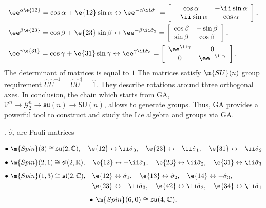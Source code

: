 \begin{example}
\begin{example}
\[\begin{split}
&\ee^{\alpha\e{12}}=\cos\alpha+\e{12}\sin\alpha\leftrightarrow\ee^{-\alpha\ii\hat{\sigma}_1}=
\left[\begin{array}{cc}\cos\alpha&-\ii\sin\alpha\\-\ii\sin\alpha&\cos\alpha\end{array}\right],\\
&\ee^{\beta\e{23}}=\cos\beta+\e{23}\sin\beta\leftrightarrow\ee^{-\beta\ii\hat{\sigma}_2}=
\left[\begin{array}{cc}\cos\beta&-\sin\beta\\\sin\beta&\cos\beta\end{array}\right],\\
&\ee^{\gamma\e{31}}=\cos\gamma+\e{31}\sin\gamma\leftrightarrow\ee^{\gamma\ii\hat{\sigma}_3}=
\left[\begin{array}{cc}\ee^{\ii\gamma}&0\\0&\ee^{-\ii\gamma}\end{array}\right].
\end{split}\]
The determinant of matrices is equal to $1$ The matrices satisfy
$\m{SU}(n)$ group requirement
$\hat{U}\hat{U}^{-1}=\hat{U}\hat{U}^{\dagger}=\hat{1}$.  They
describe rotations around three orthogonal axes. In conclusion,
the chain which starts from GA,
$\mathcal{V}^n\rightarrow\mathcal{G}_2^n\rightarrow\mathfrak{su}(n)\rightarrow\mathsf{SU}(n)$,
allows to generate groups. Thus, GA provides a powerful tool to
construct and study the Lie algebra and groups via GA.
\end{example}



%
\begin{unit}. $\hat{\sigma}_i$ are Pauli matrices

\[\bullet\ \m{Spin}(3)\cong\mathfrak{su}(2,\mathbb{C}),\quad\e{12}
\leftrightarrow \ii\hat{\sigma}_3,\quad\e{23}\leftrightarrow
-\ii\hat{\sigma}_1,\quad \e{31}\leftrightarrow
-\ii\hat{\sigma}_2\]
%
\[\bullet\ \m{Spin}(2,1)\cong\mathfrak{sl}(2,\mathbb{R}),\quad\e{12}\leftrightarrow
-\ii\hat{\sigma}_1,
\quad\e{23}\leftrightarrow\ii\hat{\sigma}_2,\quad\e{31}\leftrightarrow
\ii\hat{\sigma}_3\]
%
\[\begin{split}
 \bullet\ \m{Spin}(1,3)\cong\mathfrak{sl}(2,\mathbb{C}),\quad&\e{12}\leftrightarrow\hat{\sigma}_1,
\quad\e{13}\leftrightarrow\hat{\sigma}_2,\quad\e{14}\leftrightarrow
-\hat{\sigma}_3,\quad\\
&\e{23}\leftrightarrow
-\ii\hat{\sigma}_3,\quad\e{42}\leftrightarrow
\ii\hat{\sigma}_2,\quad\e{34}\leftrightarrow
\ii\hat{\sigma}_1\end{split}\]
%
\[\begin{split}
 \bullet\ \m{Spin}(6,0)\cong\mathfrak{su}(4,\mathbb{C}),
\end{split}\]


\end{unit}
\end{example}

